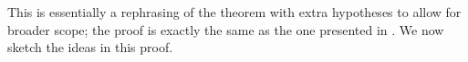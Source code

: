 \documentclass{article}
\theoremstyle{plain}
\theoremstyle{definition}
\theoremstyle{plain}
\theoremstyle{plain}
\theoremstyle{plain}
\newtheorem{lemma}[theorem]{Lemma}
\theoremstyle{remark}
\newtheorem{remark}[theorem]{Remark}
\theoremstyle{remark}
\theoremstyle{plain}
\theoremstyle{plain}
\begin{document}
This is essentially a rephrasing of the theorem with extra hypotheses to allow for broader scope; the proof is exactly the same as the one presented in \cite{wang}. We now sketch the ideas in this proof. 
%
%
%
%
\end{document}
